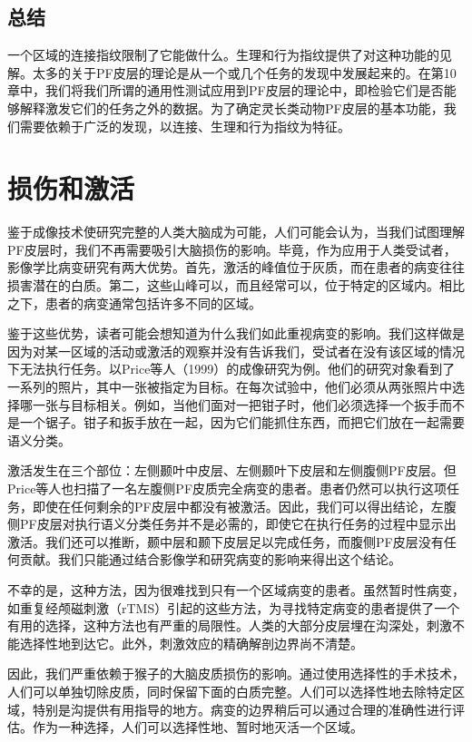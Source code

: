 \subsection{总结}
一个区域的连接指纹限制了它能做什么。生理和行为指纹提供了对这种功能的见解。太多的关于PF皮层的理论是从一个或几个任务的发现中发展起来的。在第10章中，我们将我们所谓的通用性测试应用到PF皮层的理论中，即检验它们是否能够解释激发它们的任务之外的数据。为了确定灵长类动物PF皮层的基本功能，我们需要依赖于广泛的发现，以连接、生理和行为指纹为特征。

\section{损伤和激活}
鉴于成像技术使研究完整的人类大脑成为可能，人们可能会认为，当我们试图理解PF皮层时，我们不再需要吸引大脑损伤的影响。毕竟，作为应用于人类受试者，影像学比病变研究有两大优势。首先，激活的峰值位于灰质，而在患者的病变往往损害潜在的白质。第二，这些山峰可以，而且经常可以，位于特定的区域内。相比之下，患者的病变通常包括许多不同的区域。
\par
鉴于这些优势，读者可能会想知道为什么我们如此重视病变的影响。我们这样做是因为对某一区域的活动或激活的观察并没有告诉我们，受试者在没有该区域的情况下无法执行任务。以Price等人（1999）的成像研究为例。他们的研究对象看到了一系列的照片，其中一张被指定为目标。在每次试验中，他们必须从两张照片中选择哪一张与目标相关。例如，当他们面对一把钳子时，他们必须选择一个扳手而不是一个锯子。钳子和扳手放在一起，因为它们能抓住东西，而把它们放在一起需要语义分类。
\par
激活发生在三个部位：左侧颞叶中皮层、左侧颞叶下皮层和左侧腹侧PF皮层。但Price等人也扫描了一名左腹侧PF皮质完全病变的患者。患者仍然可以执行这项任务，即使在任何剩余的PF皮层中都没有被激活。因此，我们可以得出结论，左腹侧PF皮层对执行语义分类任务并不是必需的，即使它在执行任务的过程中显示出激活。我们还可以推断，颞中层和颞下皮层足以完成任务，而腹侧PF皮层没有任何贡献。我们只能通过结合影像学和研究病变的影响来得出这个结论。
\par
不幸的是，这种方法，因为很难找到只有一个区域病变的患者。虽然暂时性病变，如重复经颅磁刺激（rTMS）引起的这些方法，为寻找特定病变的患者提供了一个有用的选择，这种方法也有严重的局限性。人类的大部分皮层埋在沟深处，刺激不能选择性地到达它。此外，刺激效应的精确解剖边界尚不清楚。
\par
因此，我们严重依赖于猴子的大脑皮质损伤的影响。通过使用选择性的手术技术，人们可以单独切除皮质，同时保留下面的白质完整。人们可以选择性地去除特定区域，特别是沟提供有用指导的地方。病变的边界稍后可以通过合理的准确性进行评估。作为一种选择，人们可以选择性地、暂时地灭活一个区域。

